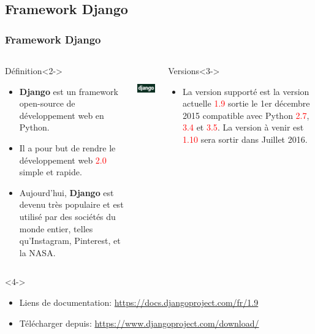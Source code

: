\subsection{Framework Django}
\begin{frame}
\frametitle{Framework Django}
\transboxout[duration=1]
\begin{columns}
\begin{column}{6.5cm}
\begin{exampleblock}{Définition}<2->
\begin{itemize}
\item \textcolor{backgroundcolor}{\textbf{Django}} est un framework open-source de développement web en 
\textcolor{colorPython}{Python}.
\item Il a pour but de rendre le développement web \textcolor{red}{2.0} simple et 
rapide.
\item Aujourd'hui, \textcolor{backgroundcolor}{\textbf{Django}} est devenu très populaire et est utilisé 
par des sociétés du monde entier, telles qu'Instagram, Pinterest, et 
la NASA.
\end{itemize}
\end{exampleblock}
\end{column}
\begin{column}{3.5cm}
\includegraphics[width=3.5cm,height=2cm]{images/django.png}
\end{column}
\begin{column}{6.5cm}
\begin{exampleblock}{Versions}<3->
\vspace*{0.8cm}
\begin{itemize}
\item La version supporté est la version actuelle \textcolor{red}{1.9} sortie le 1er décembre 
2015 compatible avec \textcolor{colorPython}{Python} \textcolor{red}{2.7}, \textcolor{red}{3.4} et \textcolor{red}{3.5}. La version à venir est \textcolor{red}{1.10} sera sortir dans Juillet 2016.
\end{itemize}
\vspace*{2cm}
\end{exampleblock}
\end{column}
\end{columns}
\begin{columns}
\begin{column}{15cm}
\begin{block}{}<4->
\begin{itemize}
\item Liens de documentation: \textcolor{urlcolor}{\url{https://docs.djangoproject.com/fr/1.9}}\\
\item  Télécharger depuis: \textcolor{urlcolor}{\url{https://www.djangoproject.com/download/}}
\end{itemize}
\end{block}
\end{column}
\end{columns}
\end{frame}

